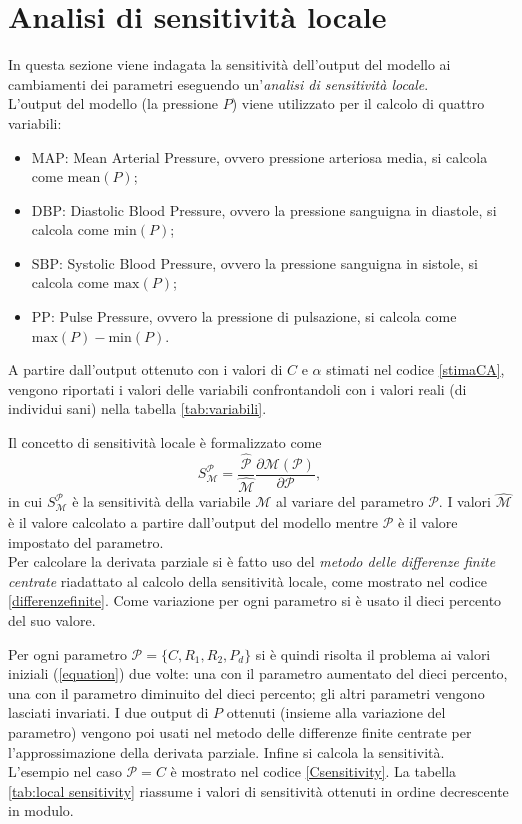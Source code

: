 \section{Analisi di sensitività locale}\label{sensitività}
In questa sezione viene indagata la sensitività dell'output del modello ai cambiamenti dei parametri eseguendo un'\textit{analisi di sensitività locale}. \\
L'output del modello (la pressione $P$) viene utilizzato per il calcolo di quattro variabili:
\begin{itemize}
  \item $\text{MAP}$: Mean Arterial Pressure, ovvero pressione arteriosa media, si calcola come $\text{mean}(P)$;
  \item $\text{DBP}$: Diastolic Blood Pressure, ovvero la pressione sanguigna in diastole, si calcola come $\text{min}(P)$;
  \item $\text{SBP}$: Systolic Blood Pressure, ovvero la pressione sanguigna in sistole, si calcola come $\text{max}(P)$;
  \item $\text{PP}$: Pulse Pressure, ovvero la pressione di pulsazione, si calcola come $\text{max}(P)-\text{min}(P)$.
\end{itemize}

\newpage

A partire dall'output ottenuto con i valori di $C$ e $\alpha$ stimati nel codice \ref{stimaCA}, vengono riportati i valori delle variabili confrontandoli con i valori reali (di individui sani) nella tabella \ref{tab:variabili}.



Il concetto di sensitività locale è formalizzato come
\[
S_\mathcal{M}^\mathcal{P}=\frac{\hat{\mathcal{P}}}{\hat{\mathcal{M}}} \frac{\partial \mathcal{M}(\mathcal{P})}{\partial \mathcal{P}},
\]
in cui $S_\mathcal{M}^\mathcal{P}$ è la sensitività della variabile $\mathcal{M}$ al variare del parametro $\mathcal{P}$. I valori $\hat{\mathcal{M}}$ è il valore calcolato a partire dall'output del modello mentre $\hat{\mathcal{P}}$ è il valore impostato del parametro.\\

Per calcolare la derivata parziale si è fatto uso del \textit{metodo delle differenze finite centrate} riadattato al calcolo della sensitività locale, come mostrato nel codice \ref{differenzefinite}. Come variazione per ogni parametro si è usato il dieci percento del suo valore.

Per ogni parametro $\mathcal{P}=\{C,R_1,R_2,P_d\}$ si è quindi risolta il problema ai valori iniziali (\ref{equation}) due volte: una con il parametro aumentato del dieci percento, una con il parametro diminuito del dieci percento; gli altri parametri vengono lasciati invariati. I due output di $P$ ottenuti (insieme alla variazione del parametro) vengono poi usati nel metodo delle differenze finite centrate per l'approssimazione della derivata parziale. Infine si calcola la sensitività. \\
L'esempio nel caso $\mathcal{P}=C$ è mostrato nel codice \ref{Csensitivity}.
La tabella \ref{tab:local sensitivity} riassume i valori di sensitività ottenuti in ordine decrescente in modulo.


